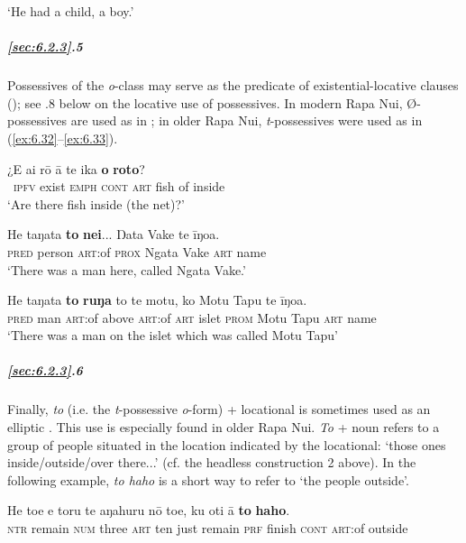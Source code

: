 \glt 
‘He had a child, a boy.’ \textstyleExampleref{[Ley-9-57.002]}
\z

\subparagraph{\ref{sec:6.2.3}.5} Possessives of the \textit{o}{}-class may serve as the predicate of existential-locative clauses (); see .8 below on the locative use of possessives. In modern Rapa Nui, Ø-possessives are used as in ; in older Rapa Nui, \textit{t}{}-possessives were used as in (\ref{ex:6.32}–\ref{ex:6.33}). 

\ea\label{ex:6.31}
\gll ¿E ai rō {\ꞌ}ā te ika \textbf{o} \textbf{roto}? \\
~\textsc{ipfv} exist \textsc{emph} \textsc{cont} \textsc{art} fish of inside \\

\glt 
‘Are there fish inside (the net)?’ \textstyleExampleref{[R241.058]} 
\z

\ea\label{ex:6.32}
\gll He taŋata \textbf{to} \textbf{nei}... Ŋata Vake te {\ꞌ}īŋoa.\\
\textsc{pred} person \textsc{art}:of \textsc{prox} Ngata Vake \textsc{art} name\\

\glt 
‘There was a man here, called Ngata Vake.’ \textstyleExampleref{[Ley-3-02.002]}
\z

\ea\label{ex:6.33}
\gll He taŋata \textbf{to} \textbf{ruŋa} to te motu, ko Motu Tapu te {\ꞌ}īŋoa. \\
\textsc{pred} man \textsc{art}:of above \textsc{art}:of \textsc{art} islet \textsc{prom} Motu Tapu \textsc{art} name \\

\glt 
‘There was a man on the islet which was called Motu Tapu’ \textstyleExampleref{[Ley-8-52.024]}
\z

\subparagraph{\ref{sec:6.2.3}.6} Finally, \textit{to} (i.e. the \textit{t}{}-possessive \textit{o}{}-form) + locational is sometimes used as an elliptic . This use is especially found in older Rapa Nui. \textit{To} + noun refers to a group of people situated in the location indicated by the locational: ‘those ones inside/outside/over there...’ (cf. the headless construction 2 above). In the following example, \textit{to haho} is a short way to refer to ‘the people outside’.

\ea\label{ex:6.34}
\gll He toe e toru te {\ꞌ}aŋahuru nō toe, ku oti {\ꞌ}ā \textbf{to} \textbf{haho}.  \\
\textsc{ntr} remain \textsc{num} three \textsc{art} ten just remain \textsc{prf} finish \textsc{cont} \textsc{art}:of outside  \\

